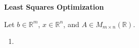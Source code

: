 \textbf{Least Squares Optimization}

Let $b \in \mathbb{R}^m$, $x \in \mathbb{R}^n$, and $A \in M_{m \times n}(\mathbb{R})$.

\begin{enumerate}
    \item 
\end{enumerate}